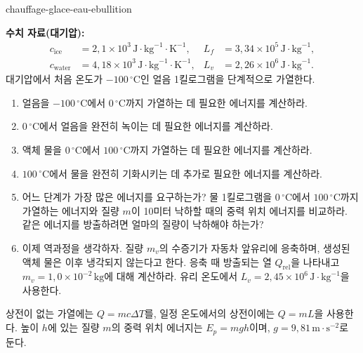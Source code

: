 
\begin{exo}{chauffage-glace-eau-ebullition}

\textbf{수치 자료(대기압):}
\[
\begin{aligned}
c_{\text{ice}} &= 2{,}1\times10^3\,\text{J}\!\cdot\!\text{kg}^{-1}\!\cdot\!\text{K}^{-1},
& L_f &= 3{,}34\times10^5\,\text{J}\!\cdot\!\text{kg}^{-1},\\
c_{\text{water}} &= 4{,}18\times10^3\,\text{J}\!\cdot\!\text{kg}^{-1}\!\cdot\!\text{K}^{-1},
& L_v &= 2{,}26\times10^6\,\text{J}\!\cdot\!\text{kg}^{-1}.
\end{aligned}
\]
대기압에서 처음 온도가 $-100\,{}^\circ\text{C}$인 얼음 1킬로그램을 단계적으로 가열한다.

\begin{enumerate}
  \item 얼음을 $-100\,{}^\circ\text{C}$에서 $0\,{}^\circ\text{C}$까지 가열하는 데 필요한 에너지를 계산하라.
  \item $0\,{}^\circ\text{C}$에서 얼음을 완전히 녹이는 데 필요한 에너지를 계산하라.
  \item 액체 물을 $0\,{}^\circ\text{C}$에서 $100\,{}^\circ\text{C}$까지 가열하는 데 필요한 에너지를 계산하라.
  \item $100\,{}^\circ\text{C}$에서 물을 완전히 기화시키는 데 추가로 필요한 에너지를 계산하라.
  \item 어느 단계가 가장 많은 에너지를 요구하는가? 물 1킬로그램을 $0\,{}^\circ\text{C}$에서 $100\,{}^\circ\text{C}$까지 가열하는 에너지와 질량 $m$이 10미터 낙하할 때의 중력 위치 에너지를 비교하라. 같은 에너지를 방출하려면 얼마의 질량이 낙하해야 하는가?
  \item 이제 역과정을 생각하자. 질량 $m_v$의 수증기가 자동차 앞유리에 응축하며, 생성된 액체 물은 이후 냉각되지 않는다고 한다. 응축 때 방출되는 열 $Q_{\text{rel}}$을 나타내고 $m_v=1{,}0\times10^{-2}\,\text{kg}$에 대해 계산하라. 유리 온도에서 $L_v=2{,}45\times10^6\,\text{J}\!\cdot\!\text{kg}^{-1}$을 사용한다.
\end{enumerate}

\begin{indication}
상전이 없는 가열에는 $Q=mc\Delta T$를, 일정 온도에서의 상전이에는 $Q=mL$을 사용한다. 높이 $h$에 있는 질량 $m$의 중력 위치 에너지는 $E_p=mgh$이며, $g=9{,}81\,\text{m}\!\cdot\!\text{s}^{-2}$로 둔다.
\end{indication}


\end{exo}
